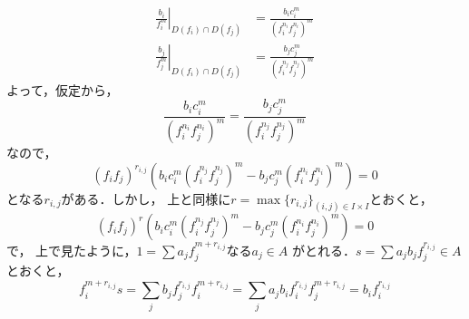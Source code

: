 {  \begin{align*}
    \left. \frac{b_{i}}{f^{m}_{i}} \right|_{D(f_{i}) \cap D(f_{j})} 
    &= \frac{b_{i}c_{i}^{m}}{(f^{n_{i}}_{i}f^{n_{i}}_{j})^{m}}\\
    \left. \frac{b_{j}}{f^{m}_{j}} \right|_{D(f_{i}) \cap D(f_{j})}
    &= \frac{b_{j}c_{j}^{m}}{(f^{n_{j}}_{i}f^{n_{j}}_{j})^{m}}
  \end{align*}
  よって，仮定から，
  \begin{equation*}
    \frac{b_{i}c_{i}^{m}}{(f^{n_{i}}_{i}f^{n_{i}}_{j})^{m}} = \frac{b_{j}c_{j}^{m}}{(f^{n_{j}}_{i}f^{n_{j}}_{j})^{m}}
  \end{equation*}
  なので，
  \begin{equation*}
    (f_{i}f_{j})^{r_{i,j}}(b_{i}c_{i}^{m}(f^{n_{j}}_{i}f^{n_{j}}_{j})^{m} - b_{j}c^{m}_{j}(f^{n_{i}}_{i}f^{n_{i}}_{j})^{m}) = 0
  \end{equation*}
  となる$r_{i,j}$がある．しかし，
  上と同様に$r = \max \{r_{i,j}\}_{(i,j)\in I\times I}$とおくと，
  \begin{equation*}
    (f_{i}f_{j})^{r}(b_{i}c_{i}^{m}(f_{i}^{n_{j}}f_{j}^{n_{j}})^{m} - b_{j}c_{j}^{m}(f_{i}^{n_{i}}f_{j}^{n_{i}})^{m}) = 0
  \end{equation*}
  で，
  上で見たように，$1 = \sum a_{j}f_{j}^{m+r_{i,j}}$なる$a_{j}\in A$
  がとれる．$s = \sum a_{j}b_{j}f^{r_{i,j}}_{j} \in A$とおくと，
  \begin{equation*}
    f^{m + r_{i,j}}_{i}s = \sum_{j}b_{j}f^{r_{i,j}}_{j}f^{m + r_{i,j}}_{i} = \sum_{j}a_{j}b_{i}f_{i}^{r_{i,j}}f_{j}^{m+r_{i,j}} = b_{i}f_{i}^{r_{i,j}}
  \end{equation*}
}



